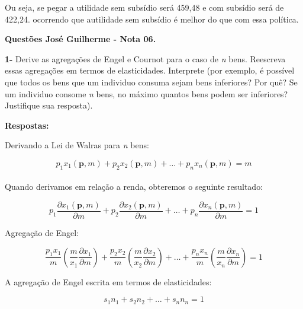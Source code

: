 \documentclass[a4paper, 12pt]{article} %
\begin{document}
\begin{flushleft}
 \begin{center}
	 Ou seja, se pegar a utilidade sem subsídio será 459,48 e com subsídio será de 422,24. ocorrendo que autilidade sem subsídio é melhor do que com essa política.
 \end{center}
\singlespacing

\textbf{Questões José Guilherme - Nota 06.}

\singlespacing

\textbf{1-} Derive as agregações de Engel e Cournot para o caso de \textit{n} bens. Reescreva essas agregações em termos de elasticidades. Interprete (por exemplo, é possível que todos os bens que um individuo consuma sejam bens inferiores? Por quê? Se um individuo consome \textit{n} bens, no máximo quantos bens podem ser inferiores? Justifique sua resposta).

\singlespacing

\textbf{Respostas:}

\singlespacing

Derivando a Lei de Walras para \textit{n} bens:

\begin{equation}
	p_{1}x_{1}(\textbf{p},m) + p_{2}x_{2}(\textbf{p},m) + \ldots + p_{n}x_{n}(\textbf{p},m) = m
\end{equation}
\\
Quando derivamos em relação a renda, obteremos o seguinte resultado:

\begin{equation}
	p_{1}\dfrac{\partial x_{1}(\textbf{p},m)}{\partial m} + p_{2}\dfrac{\partial x_{2} (\textbf{p},m)}{\partial m} + \ldots + p_{n}\dfrac{\partial x_{n} (\textbf{p}, m)}{\partial m} = 1
\end{equation}

Agregação de Engel:

\begin{equation}
	\dfrac{p_{1}x_{1}}{m} \left(\dfrac{m}{x_{1}} \dfrac{\partial x_{1}}{\partial m} \right) + 	\dfrac{p_{2}x_{2}}{m} \left(\dfrac{m}{x_{2}} \dfrac{\partial x_{2}}{\partial m} \right) + \ldots + 	\dfrac{p_{n}x_{n}}{m} \left(\dfrac{m}{x_{n}} \dfrac{\partial x_{n}}{\partial m} \right) = 1
\end{equation}

A agregação de Engel escrita em termos de elasticidades:

\begin{equation}
	s_{1}n_{1} + s_{2}n_{2} + \ldots + s_{n}n_{n} = 1
\end{equation}


\end{flushleft}
\end{document}

